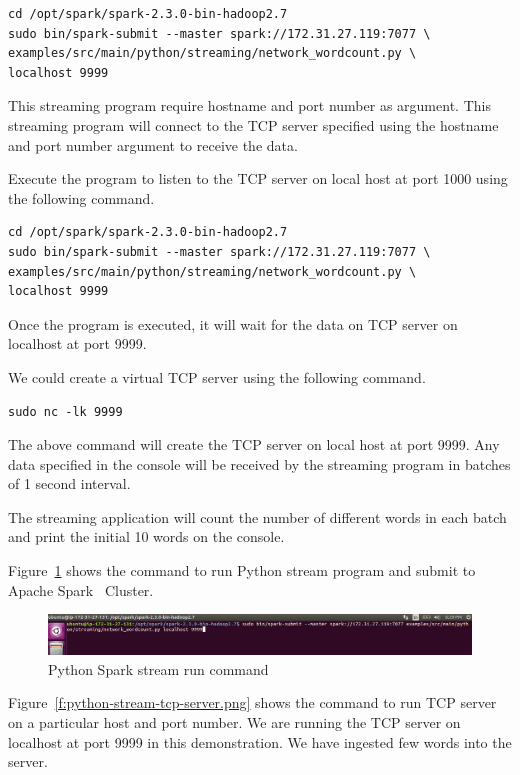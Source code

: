 \begin{verbatim}
cd /opt/spark/spark-2.3.0-bin-hadoop2.7
sudo bin/spark-submit --master spark://172.31.27.119:7077 \
examples/src/main/python/streaming/network_wordcount.py \
localhost 9999
\end{verbatim}

This streaming program require hostname and port number as
argument. This streaming program will connect to the TCP server
specified using the hostname and port number argument to receive the
data.

Execute the program to listen to the TCP server on local host at port
1000 using the following command.

\begin{verbatim}
cd /opt/spark/spark-2.3.0-bin-hadoop2.7
sudo bin/spark-submit --master spark://172.31.27.119:7077 \
examples/src/main/python/streaming/network_wordcount.py \
localhost 9999 
\end{verbatim}

Once the program is executed, it will wait for the data on TCP server
on localhost at port 9999.

We could create a virtual TCP server using the following command.

\begin{verbatim}
sudo nc -lk 9999
\end{verbatim}

The above command will create the TCP server on local host at port
9999. Any data specified in the console will be received by the
streaming program in batches of 1 second interval.

The streaming application will count the number of different words in
each batch and print the initial 10 words on the console.

Figure~\ref{f:python-spark-stream-run-command} shows the command to
run Python stream program and submit to Apache
Spark~\cite{hid-sp18-511-www-spark} Cluster.

\begin{figure}[!ht]
	\centering\includegraphics[width=\columnwidth]
        {images/pythonstreamprogruncoammand.png} \caption{Python
	Spark stream run
	command}\label{f:python-spark-stream-run-command}
\end{figure}

Figure~\ref{f:python-stream-tcp-server.png} shows the command to run
TCP server on a particular host and port number. We are running the
TCP server on localhost at port 9999 in this demonstration. We have
ingested few words into the server.

